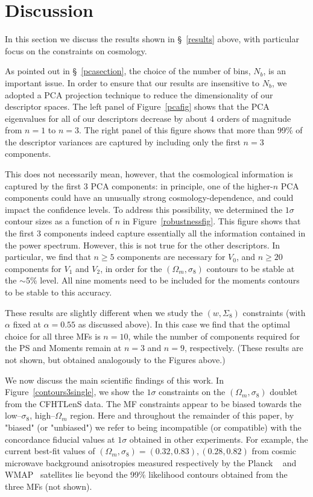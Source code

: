 \documentclass[reprint,aps,prd,superscriptaddress,showkeys,showpacs]{revtex4-1}
\begin{document}
\section{Discussion}
\label{discussion}

In this section we discuss the results shown in \S~\ref{results}
above, with particular focus on the constraints on cosmology.

As pointed out in \S~\ref{pcasection}, the choice of the number of
bins, $N_b$, is an important issue. In order to ensure that our
results are insensitive to $N_b$, we adopted a PCA projection
technique to reduce the dimensionality of our descriptor spaces. The
left panel of Figure~\ref{pcafig} shows that the PCA eigenvalues for
all of our descriptors decrease by about 4 orders of magnitude from
$n=1$ to $n=3$. The right panel of this figure shows that more than
99\% of the descriptor variances are captured by including only the
first $n=3$ components.

This does not necessarily mean, however, that the cosmological
information is captured by the first 3 PCA components: in principle,
one of the higher-$n$ PCA components could have an unusually strong
cosmology-dependence, and could impact the confidence levels.  To
address this possibility, we determined the $1\sigma$ contour sizes as
a function of $n$ in Figure~\ref{robustnessfig}.  This figure shows
that the first 3 components indeed capture essentially all the
information contained in the power spectrum. However, this is not true
for the other descriptors. In particular, we find that $n\geq5$
components are necessary for $V_0$, and $n\geq20$ components for $V_1$
and $V_2$, in order for the $(\Omega_m,\sigma_8)$ contours to be
stable at the $\sim$5\% level. All nine moments need to be included
for the moments contours to be stable to this accuracy.

These results are slightly different when we study the $(w,\Sigma_8)$
constraints (with $\alpha$ fixed at $\alpha=0.55$ as discussed
above). In this case we find that the optimal choice for all three MFs
is $n=10$, while the number of components required for the PS and
Moments remain at $n=3$ and $n=9$, respectively. (These results are
not shown, but obtained analogously to the Figures above.)

We now discuss the main scientific findings of this work. In
Figure~\ref{contours3single}, we show the $1\sigma$ constraints on the
$(\Omega_m,\sigma_8)$ doublet from the CFHTLenS data. The MF
constraints appear to be biased towards the low--$\sigma_8$,
high--$\Omega_m$ region. Here and throughout the remainder of this
paper, by "biased" (or "unbiased") we refer to being incompatible (or
compatible) with the concordance fiducial values at $1\sigma$ obtained
in other experiments. For example, the current best-fit values of
$(\Omega_m,\sigma_8)=(0.32,0.83),(0.28,0.82)$ from cosmic microwave background
anisotropies measured respectively by the Planck
~\citep{PlanckXVI2013} and WMAP~\citep{WMAP9} satellites lie beyond the 99\% likelihood
contours obtained from the three MFs (not shown).
\end{document}
